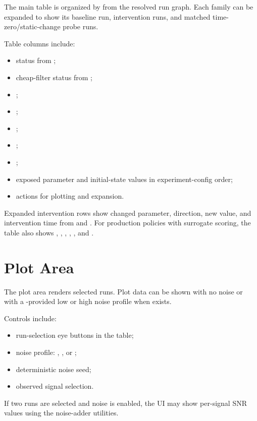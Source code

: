 \documentclass[11pt]{article}
\begin{document}
The main table is organized by  from the resolved run graph.
Each family can be expanded to show its baseline run, intervention runs, and matched time-zero/static-change probe runs.

Table columns include:

\begin{itemize}
\item status from ;
\item cheap-filter status from ;
\item {};
\item {};
\item {};
\item {};
\item {};
\item exposed parameter and initial-state values in experiment-config order;
\item actions for plotting and expansion.
\end{itemize}

Expanded intervention rows show changed parameter, direction, new value, and intervention time from  and .
For production policies with surrogate scoring, the table also shows , , , , , and .

\section*{Plot Area}

The plot area renders selected runs.
Plot data can be shown with no noise or with a \termSimulator-provided low or high noise profile when  exists.

Controls include:

\begin{itemize}
\item run-selection eye buttons in the table;
\item noise profile: , , or ;
\item deterministic noise seed;
\item observed signal selection.
\end{itemize}

If two runs are selected and noise is enabled, the UI may show per-signal SNR values using the \termSimulator noise-adder utilities.
\end{document}
